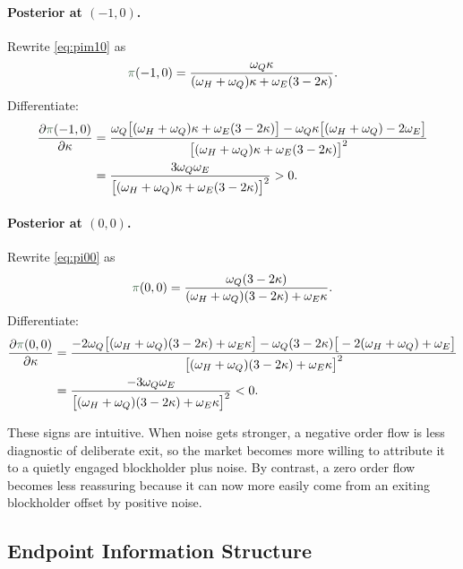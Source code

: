 \documentclass[11pt,a4paper]{article}
\theoremstyle{definition}
\theoremstyle{plain}
\theoremstyle{remark}
\newcommand{\1}{\mathbf{1}}
\newcommand{\outcome}[1]{{\color{ForestGreen!50!black}#1}}
\begin{document}
\paragraph{Posterior at $(-1,0)$.}
Rewrite \eqref{eq:pim10} as
\begin{equation}
\outcome{\pi}(-1,0)
=
\frac{\omega_Q \kappa}
{(\omega_H+\omega_Q)\kappa + \omega_E(3-2\kappa)}.
\label{eq:pim10-simplified}
\end{equation}
Differentiate:
\begin{align}
\frac{\partial \outcome{\pi}(-1,0)}{\partial \kappa}
&=
\frac{
\omega_Q\big[(\omega_H+\omega_Q)\kappa + \omega_E(3-2\kappa)\big]
- \omega_Q\kappa\big[(\omega_H+\omega_Q)-2\omega_E\big]
}
{\big[(\omega_H+\omega_Q)\kappa + \omega_E(3-2\kappa)\big]^2}
\nonumber\\
&=
\frac{3\omega_Q\omega_E}
{\big[(\omega_H+\omega_Q)\kappa + \omega_E(3-2\kappa)\big]^2}
>0.
\label{eq:pim10-deriv}
\end{align}

\paragraph{Posterior at $(0,0)$.}
Rewrite \eqref{eq:pi00} as
\begin{equation}
\outcome{\pi}(0,0)
=
\frac{\omega_Q(3-2\kappa)}
{(\omega_H+\omega_Q)(3-2\kappa)+\omega_E\kappa}.
\label{eq:pi00-simplified}
\end{equation}
Differentiate:
\begin{align}
\frac{\partial \outcome{\pi}(0,0)}{\partial \kappa}
&=
\frac{
-2\omega_Q\big[(\omega_H+\omega_Q)(3-2\kappa)+\omega_E\kappa\big]
- \omega_Q(3-2\kappa)\big[-2(\omega_H+\omega_Q)+\omega_E\big]
}
{\big[(\omega_H+\omega_Q)(3-2\kappa)+\omega_E\kappa\big]^2}
\nonumber\\
&=
\frac{-3\omega_Q\omega_E}
{\big[(\omega_H+\omega_Q)(3-2\kappa)+\omega_E\kappa\big]^2}
<0.
\label{eq:pi00-deriv}
\end{align}

\begin{econbox}
These signs are intuitive. When noise gets stronger, a negative order flow is less diagnostic of deliberate exit, so the market becomes more willing to attribute it to a quietly engaged blockholder plus noise. By contrast, a zero order flow becomes less reassuring because it can now more easily come from an exiting blockholder offset by positive noise.
\end{econbox}

\subsection{Endpoint Information Structure}
\end{document}
